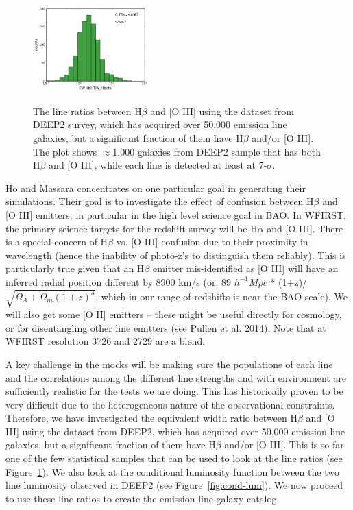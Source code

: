   \begin{figure}
   \includegraphics[width = 0.4\textwidth]{Plots/OIII-Hbeta.pdf}
  \label{fig:line-ratios}
   \caption{The line ratios between H$\beta$ and [O III] using the  dataset from DEEP2 survey, which has acquired over 50,000 emission line galaxies, but a significant fraction of them have H$\beta$ and/or [O III]. The plot shows $\approx$1,000 galaxies from DEEP2 sample that has both H$\beta$ and [O III], while each line is detected at least at 7-$\sigma$.}
  \end{figure}

 Ho and Massara concentrates on one particular goal in generating their simulations. Their goal is to investigate the effect of confusion between H$\beta$ and [O III] emitters, in particular in the high level science goal in BAO. In WFIRST,  the primary science targets for the redshift survey will be H$\alpha$ and [O III]. There is a special concern of H$\beta$ vs. [O III] confusion due to their proximity in wavelength (hence the inability of photo-z's to distinguish them reliably). This is particularly true given that an H$\beta$ emitter mis-identified as [O III] will have an inferred radial position different by 8900 km/s (or: 89 $h^{-1} Mpc$ * (1+z)/$\sqrt{\Omega_\Lambda + \Omega_m (1+z)^3}$, which in our range of redshifts is near the BAO scale). We will also get some [O II] emitters -- these might be useful directly for cosmology, or for disentangling other line emitters (see Pullen et al. 2014). Note that at WFIRST resolution 3726 and 2729 are a blend.

 A key challenge in the mocks will be making sure the populations of each line and the correlations among the different line strengths and with environment are sufficiently realistic for the tests we are doing. This has historically proven to be very difficult due to the heterogeneous nature of the observational constraints. Therefore, we have investigated the equivalent width ratio between H$\beta$ and [O III] using the dataset from DEEP2, which has acquired over 50,000 emission line galaxies, but a significant fraction of them have H$\beta$ and/or [O III]. This is so far one of the few statistical samples that can be used to look at the line ratios (see Figure~\ref{fig:line-ratios}). We also look at the conditional luminosity function between the two line luminosity observed in DEEP2 (see Figure~\ref{fig:cond-lum}). We now proceed to use these line ratios to create the emission line galaxy catalog.

